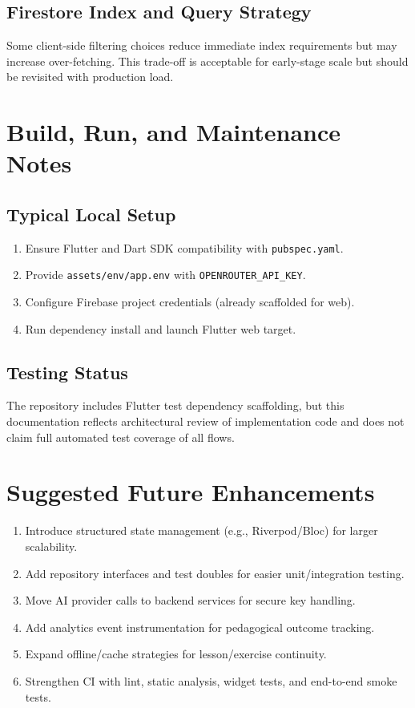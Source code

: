 \documentclass[11pt,a4paper]{article}
\begin{document}
\subsection{Firestore Index and Query Strategy}
Some client-side filtering choices reduce immediate index requirements but may increase over-fetching. This trade-off is acceptable for early-stage scale but should be revisited with production load.

\section{Build, Run, and Maintenance Notes}
\subsection{Typical Local Setup}
\begin{enumerate}
  \item Ensure Flutter and Dart SDK compatibility with \texttt{pubspec.yaml}.
  \item Provide \texttt{assets/env/app.env} with \texttt{OPENROUTER\_API\_KEY}.
  \item Configure Firebase project credentials (already scaffolded for web).
  \item Run dependency install and launch Flutter web target.
\end{enumerate}

\subsection{Testing Status}
The repository includes Flutter test dependency scaffolding, but this documentation reflects architectural review of implementation code and does not claim full automated test coverage of all flows.

\section{Suggested Future Enhancements}
\begin{enumerate}
  \item Introduce structured state management (e.g., Riverpod/Bloc) for larger scalability.
  \item Add repository interfaces and test doubles for easier unit/integration testing.
  \item Move AI provider calls to backend services for secure key handling.
  \item Add analytics event instrumentation for pedagogical outcome tracking.
  \item Expand offline/cache strategies for lesson/exercise continuity.
  \item Strengthen CI with lint, static analysis, widget tests, and end-to-end smoke tests.
\end{enumerate}
\end{document}

